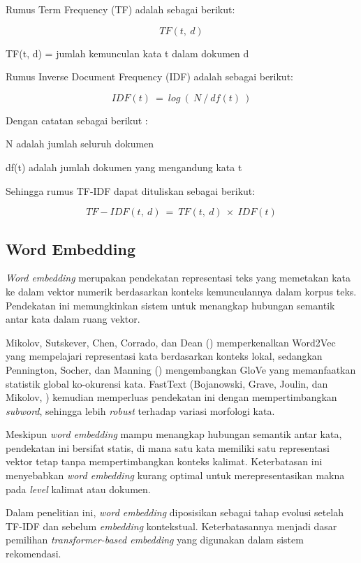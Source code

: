 Rumus Term Frequency (TF) adalah sebagai berikut:

\[TF(t,\ d)\]

TF(t, d) = jumlah kemunculan kata t dalam dokumen d

Rumus Inverse Document Frequency (IDF) adalah sebagai berikut:

\[IDF(t)\  = \ log\ (\ N\ /\ df(t)\ )\]

Dengan catatan sebagai berikut :

N adalah jumlah seluruh dokumen

df(t) adalah jumlah dokumen yang mengandung kata t

Sehingga rumus TF-IDF dapat dituliskan sebagai berikut:

\[TF - IDF(t,\ d)\  = \ TF(t,\ d)\  \times \ IDF(t)\]

\subsection{Word Embedding}\label{word-embedding}

\textit{Word embedding} merupakan pendekatan representasi teks yang memetakan kata ke dalam vektor numerik berdasarkan konteks kemunculannya dalam korpus teks. Pendekatan ini memungkinkan sistem untuk menangkap hubungan semantik antar kata dalam ruang vektor.

Mikolov, Sutskever, Chen, Corrado, dan Dean (\citeyear{mikolov2013word2vec}) memperkenalkan Word2Vec yang mempelajari representasi kata berdasarkan konteks lokal, sedangkan Pennington, Socher, dan Manning (\citeyear{pennington2014glove}) mengembangkan GloVe yang memanfaatkan statistik global ko-okurensi kata. FastText (Bojanowski, Grave, Joulin, dan Mikolov, \citeyear{bojanowski2017fasttext}) kemudian memperluas pendekatan ini dengan mempertimbangkan \textit{subword}, sehingga lebih \textit{robust} terhadap variasi morfologi kata.

Meskipun \textit{word embedding} mampu menangkap hubungan semantik antar kata, pendekatan ini bersifat statis, di mana satu kata memiliki satu representasi vektor tetap tanpa mempertimbangkan konteks kalimat. Keterbatasan ini menyebabkan \textit{word embedding} kurang optimal untuk merepresentasikan makna pada \textit{level} kalimat atau dokumen.

Dalam penelitian ini, \textit{word embedding} diposisikan sebagai tahap evolusi setelah TF-IDF dan sebelum \textit{embedding} kontekstual. Keterbatasannya menjadi dasar pemilihan \textit{transformer-based embedding} yang digunakan dalam sistem rekomendasi.

